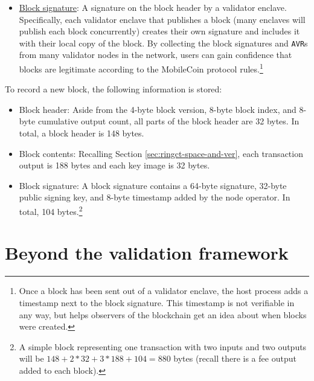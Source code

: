 \begin{itemize}
    \item \underline{Block signature}: A signature on the block header by a validator enclave. Specifically, each validator enclave that publishes a block (many enclaves will publish each block concurrently) creates their own signature and includes it with their local copy of the block. By collecting the block signatures and {\tt AVR}s from many validator nodes in the network, users can gain confidence that blocks are legitimate according to the MobileCoin protocol rules.\footnote{Once a block has been sent out of a validator enclave, the host process adds a timestamp next to the block signature. This timestamp is not verifiable in any way, but helps observers of the blockchain get an idea about when blocks were created.}
\end{itemize}\vspace{.05cm}

To record a new block, the following information is stored:

\begin{itemize}
    \item Block header: Aside from the 4-byte block version, 8-byte block index, and 8-byte cumulative output count, all parts of the block header are 32 bytes. In total, a block header is 148 bytes.

    \item Block contents: Recalling Section \ref{sec:ringct-space-and-ver}, each transaction output is 188 bytes and each key image is 32 bytes.

    \item Block signature: A block signature contains a 64-byte signature, 32-byte public signing key, and 8-byte timestamp added by the node operator. In total, 104 bytes.\footnote{A simple block representing one transaction with two inputs and two outputs will be $148 + 2*32 + 3*188 + 104 = 880$ bytes (recall there is a fee output added to each block).}
\end{itemize}



\section{Beyond the validation framework}
\label{sec:blockchain-beyond-validation-framework}

